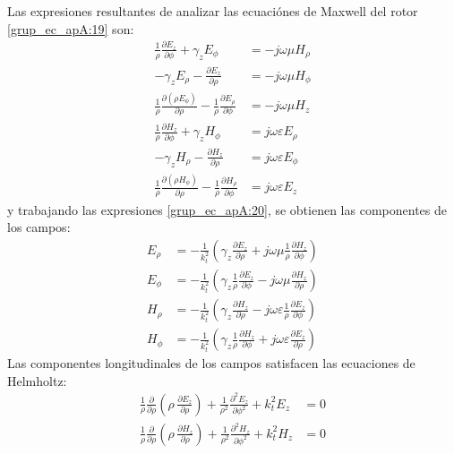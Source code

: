 Las expresiones resultantes de analizar las ecuaciónes de Maxwell del rotor \eqref{grup_ec_apA:19} son:
\begin{subequations}
\label{grup_ec_apA:20}
\begin{align}
\frac{1}{\rho}\frac{\partial E_z}{\partial\phi} + \gamma_z E_{\phi} &= -j\omega\mu H_{\rho}
\label{ec_apA:89}\\
-\gamma_z E_{\rho} - \frac{\partial E_z}{\partial\rho}  &= -j\omega\mu H_{\phi}
\label{ec_apA:90}\\
\frac{1}{\rho}\frac{\partial\left(\rho E_{\phi}\right)}{\partial\rho} - \frac{1}{\rho}\frac{\partial E_{\rho}}{\partial\phi} &= -j\omega\mu H_z
\label{ec_apA:91}\\
\frac{1}{\rho}\frac{\partial H_z}{\partial\phi} + \gamma_z H_{\phi}  &= j\omega\varepsilon E_{\rho}
\label{ec_apA:92}\\
-\gamma_z H_{\rho} - \frac{\partial H_z}{\partial\rho}  &= j\omega\varepsilon E_{\phi}
\label{ec_apA:93}\\
\frac{1}{\rho}\frac{\partial\left(\rho H_{\phi}\right)}{\partial\rho} - \frac{1}{\rho}\frac{\partial H_{\rho}}{\partial\phi} &= j\omega\varepsilon E_z
\label{ec_apA:94}
\end{align}
\end{subequations}
y trabajando las expresiones \eqref{grup_ec_apA:20}, se obtienen las componentes de los campos:
\begin{subequations}
\label{grup_ec_apA:21}
\begin{align}
E_{\rho} &= -\frac{1}{k^2_t}\left(\gamma_z\frac{\partial E_z}{\partial\rho} + j\omega\mu\frac{1}{\rho}\frac{\partial H_z}{\partial\phi}\right)
\label{ec_apA:95}\\
E_{\phi} &= -\frac{1}{k^2_t}\left(\gamma_z\frac{1}{\rho}\frac{\partial E_z}{\partial\phi} - j\omega\mu\frac{\partial H_z}{\partial\rho}\right)
\label{ec_apA:96}\\
H_{\rho} &= -\frac{1}{k^2_t}\left(\gamma_z\frac{\partial H_z}{\partial\rho} - j\omega\varepsilon\frac{1}{\rho}\frac{\partial E_z}{\partial\phi}\right)
\label{ec_apA:97}\\
H_{\phi} &= -\frac{1}{k^2_t}\left(\gamma_z\frac{1}{\rho}\frac{\partial H_z}{\partial\phi} + j\omega\varepsilon\frac{\partial E_z}{\partial\rho}\right)
\label{ec_apA:98}
\end{align}
\end{subequations}
Las componentes longitudinales de los campos satisfacen las ecuaciones de Helmholtz:
\begin{subequations}
\label{grup_ec_apA:22}
\begin{align}
\frac{1}{\rho}\frac{\partial}{\partial\rho}\left(\!\rho\,\frac{\partial E_z}{\partial\rho}\right) + \frac{1}{\rho^2}\frac{\partial^2E_z}{\partial\phi^2} + k^2_tE_z &= 0
\label{ec_apA:99}\\
\frac{1}{\rho}\frac{\partial}{\partial\rho}\left(\!\rho\,\frac{\partial H_z}{\partial\rho}\right) + \frac{1}{\rho^2}\frac{\partial^2H_z}{\partial\phi^2} + k^2_tH_z &= 0
\label{ec_apA:100}
\end{align}
\end{subequations}
